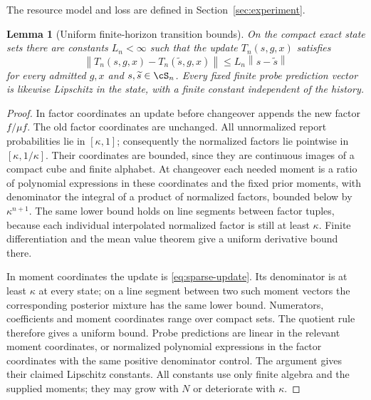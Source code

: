 \documentclass[11pt]{amsart}
\newtheorem{lemma}[theorem]{Lemma}
\theoremstyle{definition}\newtheorem{definition}[theorem]{Definition}
\theoremstyle{remark}\newtheorem{remark}[theorem]{Remark}
\newcommand{\norm}[1]{\left\lVert#1\right\rVert}
\begin{document}
The resource model and loss are defined in Section~\ref{sec:experiment}.

\begin{lemma}[Uniform finite-horizon transition bounds]\label{lem:lipschitz}
On the compact exact state sets there are constants $L_n<\infty$ such
that the update $T_n(s,g,x)$ satisfies
\[
 \norm{T_n(s,g,x)-T_n(\widetilde s,g,x)}
 \le L_n\norm{s-\widetilde s}
\]
for every admitted $g,x$ and $s,\widetilde s\in\cS_n$.
Every fixed finite probe prediction vector is likewise Lipschitz in the
state, with a finite constant independent of the history.
\end{lemma}
\begin{proof}
In factor coordinates an update before changeover appends the new factor
$f/\mu f$. The old factor coordinates are unchanged. All unnormalized
report probabilities lie in $[\kappa,1]$; consequently the normalized
factors lie pointwise in $[\kappa,1/\kappa]$. Their coordinates are bounded,
since they are continuous images of a compact cube and finite alphabet.
At changeover each needed moment is a ratio of polynomial expressions in
these coordinates and the fixed prior moments, with denominator the
integral of a product of normalized factors, bounded below by $\kappa^{n+1}$.
The same lower bound holds on line segments between factor tuples,
because each individual interpolated normalized factor is still at least
$\kappa$. Finite differentiation and the mean value theorem give a
uniform derivative bound there.

In moment coordinates the update is \eqref{eq:sparse-update}. Its
denominator is at least $\kappa$ at every state; on a line segment between
two such moment vectors the corresponding posterior mixture has the same
lower bound. Numerators, coefficients and moment coordinates range over
compact sets. The quotient rule therefore gives a uniform bound. Probe
predictions are linear in the relevant moment coordinates, or normalized
polynomial expressions in the factor coordinates with the same positive
denominator control. The argument gives their claimed Lipschitz constants.
All constants use only finite algebra and the supplied moments; they may
grow with $N$ or deteriorate with $\kappa$.
\end{proof}
\end{document}

